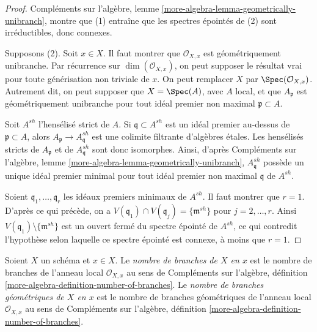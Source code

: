 \begin{proof}
Compléments sur l'algèbre, lemme \ref{more-algebra-lemma-geometrically-unibranch},
montre que (1) entraîne que les spectres épointés de (2) sont
irréductibles, donc connexes.

\medskip\noindent
Supposons (2). Soit $x \in X$. Il faut montrer que $\mathcal{O}_{X, x}$
est géométriquement unibranche. Par récurrence sur $\dim(\mathcal{O}_{X, x})$,
on peut supposer le résultat vrai pour toute générisation non triviale de $x$.
On peut remplacer $X$ par $\Spec(\mathcal{O}_{X, x})$. Autrement dit,
on peut supposer que $X = \Spec(A)$, avec $A$ local, et que
$A_\mathfrak p$ est géométriquement unibranche pour tout idéal premier
non maximal $\mathfrak p \subset A$.

\medskip\noindent
Soit $A^{sh}$ l'hensélisé strict de $A$. Si
$\mathfrak q \subset A^{sh}$ est un idéal premier au-dessus de $\mathfrak p \subset A$,
alors $A_\mathfrak p \to A^{sh}_\mathfrak q$ est une
colimite filtrante d'algèbres \'etales. Les hensélisés stricts de
$A_\mathfrak p$ et de $A^{sh}_\mathfrak q$ sont donc isomorphes.
Ainsi, d'après Compléments sur l'algèbre, lemme \ref{more-algebra-lemma-geometrically-unibranch},
$A^{sh}_\mathfrak q$
possède un unique idéal premier minimal pour tout idéal premier non maximal $\mathfrak q$ de
$A^{sh}$.

\medskip\noindent
Soient $\mathfrak q_1, \ldots, \mathfrak q_r$ les idéaux premiers minimaux
de $A^{sh}$. Il faut montrer que $r = 1$. D'après ce qui précède,
on a $V(\mathfrak q_1) \cap V(\mathfrak q_j) = \{\mathfrak m^{sh}\}$
pour $j = 2, \ldots, r$. Ainsi $V(\mathfrak q_1) \setminus \{\mathfrak m^{sh}\}$
est un ouvert fermé du spectre épointé de $A^{sh}$,
ce qui contredit l'hypothèse selon laquelle ce spectre épointé
est connexe, à moins que $r = 1$.
\end{proof}

\begin{definition}
\label{definition-number-of-branches}
Soient $X$ un schéma et $x \in X$. Le {\it nombre de branches de $X$
en $x$} est le nombre de branches de l'anneau local $\mathcal{O}_{X, x}$
au sens de
Compléments sur l'algèbre, définition \ref{more-algebra-definition-number-of-branches}.
Le {\it nombre de branches géométriques de $X$ en $x$} est le nombre de
branches géométriques de l'anneau local $\mathcal{O}_{X, x}$ au sens de
Compléments sur l'algèbre, définition \ref{more-algebra-definition-number-of-branches}.
\end{definition}


